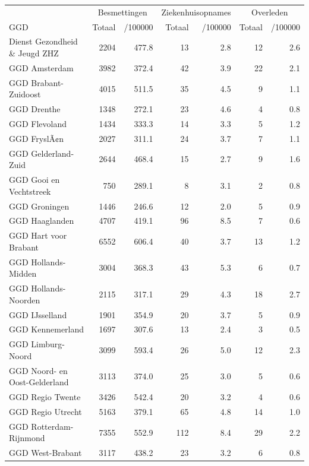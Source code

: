 \documentclass[
  english,
  man,floatsintext]{apa6}
\begin{document}
\begin{table}
\centering\begingroup\fontsize{10}{12}\selectfont

\begin{threeparttable}
\begin{tabular}{lrrrrrr}
\toprule
\multicolumn{1}{c}{ } & \multicolumn{2}{c}{Besmettingen} & \multicolumn{2}{c}{Ziekenhuisopnames} & \multicolumn{2}{c}{Overleden} \\
\cmidrule(l{3pt}r{3pt}){2-3} \cmidrule(l{3pt}r{3pt}){4-5} \cmidrule(l{3pt}r{3pt}){6-7}
GGD & Totaal & /100000 & Totaal & /100000 & Totaal & /100000\\
\midrule
Dienst Gezondheid \& Jeugd ZHZ & 2204 & 477.8 & 13 & 2.8 & 12 & 2.6\\
GGD Amsterdam & 3982 & 372.4 & 42 & 3.9 & 22 & 2.1\\
GGD Brabant-Zuidoost & 4015 & 511.5 & 35 & 4.5 & 9 & 1.1\\
GGD Drenthe & 1348 & 272.1 & 23 & 4.6 & 4 & 0.8\\
GGD Flevoland & 1434 & 333.3 & 14 & 3.3 & 5 & 1.2\\
GGD FryslÃ¢n & 2027 & 311.1 & 24 & 3.7 & 7 & 1.1\\
GGD Gelderland-Zuid & 2644 & 468.4 & 15 & 2.7 & 9 & 1.6\\
GGD Gooi en Vechtstreek & 750 & 289.1 & 8 & 3.1 & 2 & 0.8\\
GGD Groningen & 1446 & 246.6 & 12 & 2.0 & 5 & 0.9\\
GGD Haaglanden & 4707 & 419.1 & 96 & 8.5 & 7 & 0.6\\
GGD Hart voor Brabant & 6552 & 606.4 & 40 & 3.7 & 13 & 1.2\\
GGD Hollands-Midden & 3004 & 368.3 & 43 & 5.3 & 6 & 0.7\\
GGD Hollands-Noorden & 2115 & 317.1 & 29 & 4.3 & 18 & 2.7\\
GGD IJsselland & 1901 & 354.9 & 20 & 3.7 & 5 & 0.9\\
GGD Kennemerland & 1697 & 307.6 & 13 & 2.4 & 3 & 0.5\\
GGD Limburg-Noord & 3099 & 593.4 & 26 & 5.0 & 12 & 2.3\\
GGD Noord- en Oost-Gelderland & 3113 & 374.0 & 25 & 3.0 & 5 & 0.6\\
GGD Regio Twente & 3426 & 542.4 & 20 & 3.2 & 4 & 0.6\\
GGD Regio Utrecht & 5163 & 379.1 & 65 & 4.8 & 14 & 1.0\\
GGD Rotterdam-Rijnmond & 7355 & 552.9 & 112 & 8.4 & 29 & 2.2\\
GGD West-Brabant & 3117 & 438.2 & 23 & 3.2 & 6 & 0.8\\

\end{tabular}
\end{threeparttable}
\end{table}
\end{document}
